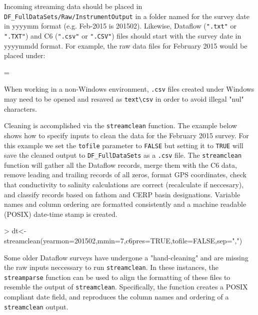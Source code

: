 \documentclass[12pt]{article}
\newenvironment{warning}
{\par\begin{mdframed}[linewidth=2pt,linecolor=red]
\begin{list}{}{\leftmargin=1cm
  \labelwidth=\leftmargin}\item[\Large\ding{43}]}
{\end{list}\end{mdframed}\par}
\begin{document}
Incoming streaming data should be placed in \verb|DF_FullDataSets|\texttt{/Raw/InstrumentOutput} in a folder named for the survey date in yyyymm format (e.g. Feb-2015 is 201502). Likewise, Dataflow (\texttt{".txt"} or \texttt{".TXT"}) and C6 (\texttt{".csv"} or \texttt{".CSV"})  files should start with the survey date in yyyymmdd format. For example, the raw data files for February 2015 would be placed under:


\begin{warning}
When working in a non-Windows environment, \texttt{.csv} files created under Windows may need to be opened and resaved as \texttt{text}\verb|\csv| in order to avoid illegal "nul" characters.
\end{warning}

\vspace{15pt}
Cleaning is accomplished via the \nohyphens{\texttt{streamclean}} function. The example below shows how to specify inputs to clean the data for the February 2015 survey. For this example we set the \texttt{tofile} parameter to \texttt{FALSE} but setting it to \texttt{TRUE} will save the cleaned output to \verb|DF_FullDataSets| as a \texttt{.csv} file. The \texttt{streamclean} function will gather all the Dataflow records, merge them with the C6 data, remove leading and trailing records of all zeros, format GPS coordinates, check that conductivity to salinity calculations are correct (recalculate if neccesary), and classify records based on fathom and CERP basin designations. Variable names and column ordering are formatted consistently and a machine readable (POSIX) date-time stamp is created.   

\begin{Schunk}
\begin{Sinput}
> dt<-streamclean(yearmon=201502,mmin=7,c6pres=TRUE,tofile=FALSE,sep=",")
\end{Sinput}
\end{Schunk}

Some older Dataflow surveys have undergone a "hand-cleaning" and are missing the raw inputs neccessary to run \texttt{streamclean}. In these instances, the \texttt{streamparse} function can be used to align the formatting of these files to resemble the output of \texttt{streamclean}. Specifically, the function creates a POSIX compliant date field, and reproduces the column names and ordering of a \texttt{streamclean} output. 
\end{document}
